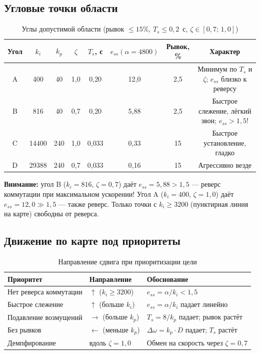\documentclass[12pt,a4paper]{article}
\begin{document}
\subsection{Угловые точки области}

\begin{table}[H]
\centering
\caption{Углы допустимой области (рывок $\le 15\%$, $T_s \le 0{,}2$~с, $\zeta \in [0{,}7;\,1{,}0]$)}
\begin{tabular}{cccccccc}
\toprule
Угол & $k_i$ & $k_p$ & $\zeta$ & $T_s$, с & $e_{ss}(\alpha=4800)$ & Рывок, \% & Характер \\
\midrule
A & 400 & 40 & 1{,}0 & 0{,}20 & 12{,}0 & 2{,}5 & Минимум по $T_s$ и $\zeta$; $e_{ss}$ близко к реверсу \\
B & 816 & 40 & 0{,}7 & 0{,}20 & 5{,}88 & 2{,}5 & Быстрое слежение, лёгкий звон; $e_{ss} > 1{,}5$! \\
C & 14400 & 240 & 1{,}0 & 0{,}033 & 0{,}33 & 15 & Быстрое установление, гладко \\
D & 29388 & 240 & 0{,}7 & 0{,}033 & 0{,}16 & 15 & Агрессивно везде \\
\bottomrule
\end{tabular}
\end{table}

\textbf{Внимание:} угол B ($k_i=816$, $\zeta=0{,}7$) даёт $e_{ss} = 5{,}88 > 1{,}5$
--- реверс коммутации при максимальном ускорении!
Угол A ($k_i=400$, $\zeta=1{,}0$) даёт $e_{ss} = 12{,}0 \gg 1{,}5$ --- также реверс.
Только точки с $k_i \ge 3200$ (пунктирная линия на карте) свободны от реверса.

\subsection{Движение по карте под приоритеты}

\begin{table}[H]
\centering
\caption{Направление сдвига при приоритизации цели}
\begin{tabular}{lll}
\toprule
Приоритет & Направление & Обоснование \\
\midrule
Нет реверса коммутации & $\uparrow$ ($k_i \ge 3200$) & $e_{ss} = \alpha/k_i < 1{,}5$ \\
Быстрое слежение & $\uparrow$ (больше $k_i$) & $e_{ss} = \alpha/k_i$ падает линейно \\
Подавление возмущений & $\rightarrow$ (больше $k_p$) & $T_s = 8/k_p$ падает; рывок растёт \\
Без рывков & $\leftarrow$ (меньше $k_p$) & $\Delta\omega = k_p \cdot D$ падает; $T_s$ растёт \\
Демпфирование & вдоль $\zeta = 1{,}0$ & Обмен на скорость через $\zeta = 0{,}7$ \\
\bottomrule
\end{tabular}
\end{table}
\end{document}
